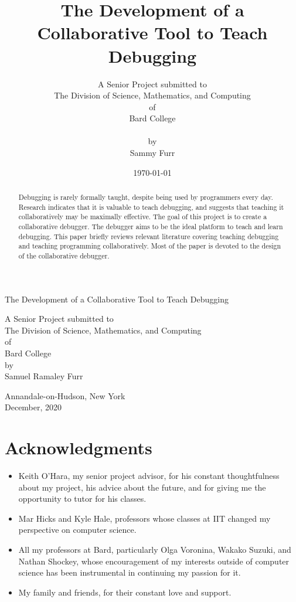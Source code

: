 \documentclass[12pt]{article}
\author{A Senior Project submitted to\\The Division of Science, Mathematics, and Computing\\of\\Bard College\\\\by\\Sammy Furr}
\title{The Development of a Collaborative Tool to Teach Debugging}
\date{\today}
\begin{document}
\begin{titlepage}
  \linespread{1}
    \begin{center}
            
        \Huge
        The Development of a Collaborative Tool to Teach Debugging
        
        \vspace{4cm}
       
        \large
        A Senior Project submitted to\\
        The Division of Science, Mathematics, and Computing\\
        of\\
        Bard College\\
        \vspace{1cm}
        by\\
        Samuel Ramaley Furr
        \vfill
            
        Annandale-on-Hudson, New York\\
        December, 2020
    \end{center}
\end{titlepage}

\begin{abstract}
  \linespread{1} Debugging is rarely formally taught, despite being
  used by programmers every day.  Research indicates that it is
  valuable to teach debugging, and suggests that teaching it
  collaboratively may be maximally effective.  The goal of this
  project is to create a collaborative debugger.  The debugger aims to
  be the ideal platform to teach and learn debugging.  This paper
  briefly reviews relevant literature covering teaching debugging and
  teaching programming collaboratively.  Most of the paper is devoted
  to the design of the collaborative debugger.
\end{abstract}

\section{Acknowledgments}

\begin{itemize}
\item Keith O'Hara, my senior project advisor, for his constant
  thoughtfulness about my project, his advice about the future, and
  for giving me the opportunity to tutor for his classes.
\item Mar Hicks and Kyle Hale, professors whose classes at IIT changed
  my perspective on computer science.
\item All my professors at Bard, particularly Olga Voronina, Wakako
  Suzuki, and Nathan Shockey, whose encouragement of my interests
  outside of computer science has been instrumental in continuing my
  passion for it.
\item My family and friends, for their constant love and support.
\end{itemize}
\end{document}
